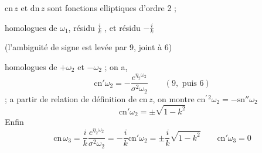 $\mathrm{cn}\,z$ et $\mathrm{dn}\,z$ sont fonctions elliptiques d'ordre 2 ;

 homologues de $\omega_1$, résidu $\frac{i}{k}$ , et    résidu $-\frac{i}{k}$

(l'ambiguité de signe est levée par 9, joint à 6)

  homologues de $+\omega_2$ et $-\omega_2$ ; on a,
\[
\mathrm{cn}'\omega_2=-\frac{e^{\eta_2\omega_2}}{\sigma^2\omega_2}\qquad (9,\text{ puis }6)
\]
; a partir de relation de définition de $\mathrm{cn}\,z$, on montre $\mathrm{cn}^{\prime\,2}\omega_2=-\mathrm{sn}''\omega_2$
\[
\mathrm{cn}'\omega_2=\pm\sqrt{1-k^2}
\]
Enfin
\[
\mathrm{cn}\,\omega_3=\frac{i}{k}\frac{e^{\eta_2\omega_2}}{\sigma^2\omega_2}=-\frac{i}{k}\mathrm{cn}'\omega_2=\pm\frac{i}{k}\sqrt{1-k^2}\qquad \mathrm{cn}'\omega_3=0
\]

